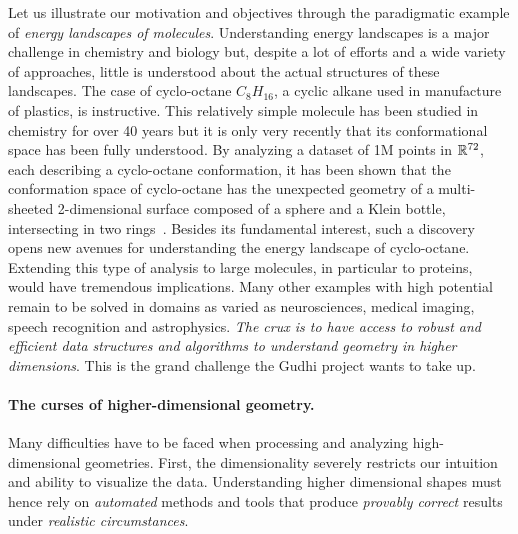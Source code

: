 Let us illustrate our motivation and objectives through the paradigmatic example of {\em energy landscapes of molecules}. Understanding  energy landscapes is a major challenge in chemistry and biology but,  despite a lot of efforts and a wide variety of approaches, little is understood about the actual structures of these landscapes. The case of cyclo-octane $C_8H_{16}$, a cyclic alkane used in manufacture of plastics, is instructive. This relatively simple molecule has been studied in chemistry for over 40 years but it is only very recently that its conformational space has been fully understood. By analyzing a dataset of 1M points in $\mathbb R^{72}$, each describing a cyclo-octane conformation, it has been shown that the conformation space of cyclo-octane has the unexpected geometry of  a multi-sheeted 2-dimensional surface composed of a sphere and a Klein bottle, intersecting in two rings~\cite{mtcw-tco-2010}.  Besides its fundamental interest, such a discovery opens new avenues for understanding the energy landscape of cyclo-octane. Extending this type of analysis to large molecules, in particular to proteins, would have tremendous implications. Many other examples with high potential remain to be solved in domains as varied as neurosciences, medical imaging, speech recognition and astrophysics. {\em The crux is to have access to robust and efficient data structures and algorithms to understand geometry in higher dimensions}. This is the grand challenge the Gudhi project wants to take up.

\vspace{-1mm}

\paragraph{The curses of higher-dimensional geometry.} 
Many difficulties have to be faced when processing and analyzing
high-dimensional geometries. First, the dimensionality severely restricts our intuition and ability to visualize the data.  Understanding higher dimensional shapes must hence rely on {\em automated} methods and tools that produce {\em provably correct} results under {\em realistic circumstances}.

